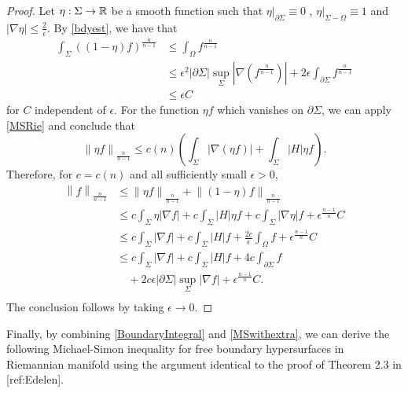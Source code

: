 \begin{proof}
    Let $\eta : \Sigma \to \mathbb{R}$ be a smooth function such that $\eta |_{\partial \Sigma } \equiv 0$ , $\eta |_{ \Sigma - \Omega } \equiv 1$ and $\left| \nabla \eta  \right| \leq \frac{2}{\epsilon }$. By \autoref{bdyest}, we have that 
    \begin{equation*}
    \begin{split}
        \int_{\Sigma} \left( \left( 1-\eta  \right) f \right) ^{\frac{n}{n-1}}
    &\leq \int_{\Omega }^{} f_{}^{\frac{n}{n-1}}   \\
    &\leq \epsilon ^2 \left| \partial \Sigma  \right| \sup _{\Sigma }\left| \nabla \left( f_{}^{\frac{n}{n-1}} \right)  \right| +2 \epsilon \int_{\partial \Sigma} f_{}^{\frac{n}{n-1}} \\
    &\leq \epsilon C
    \end{split}
    \end{equation*}
    for $C$ independent of $\epsilon $. For the function $\eta f$ which vanishes on $\partial \Sigma $, we can apply \autoref{MSRie} and conclude that 
    \[\left\| \eta  f \right\| _{\frac{n}{n-1}} \leq  c(n) \left( \int_{\Sigma} \left| \nabla (\eta f) \right| + \int_{\Sigma} \left| H  \right|\eta f  \right). \] 
    Therefore, for $c=c(n)$ and all sufficiently small $\epsilon >0$,
    \begin{equation*}
    \begin{split}
        \left\| f \right\| _{\frac{n}{n-1}} 
    &\leq \left\| \eta  f \right\| _{\frac{n}{n-1}}+\left\| (1-\eta )f \right\| _{\frac{n}{n-1}}  \\
    & \leq c \int_{\Sigma} \eta \left| \nabla f \right| +c \int_{\Sigma} \left| H \right| \eta f + c \int_{\Sigma} \left| \nabla \eta  \right| f + \epsilon ^{\frac{n-1}{n}}C\\
    &\leq c \int_{\Sigma}  \left| \nabla f \right| +c \int_{\Sigma} \left| H \right| f + \frac{2c}{\epsilon } \int_{\Omega }  f + \epsilon ^{\frac{n-1}{n}}C\\
    &\leq c \int_{\Sigma}  \left| \nabla f \right| +c \int_{\Sigma} \left| H \right| f +4c \int_{\partial \Sigma} f\\
    &\quad + 2c \epsilon  \left| \partial \Sigma  \right| \sup _{\Sigma }\left| \nabla f \right|+ \epsilon ^{\frac{n-1}{n}}C.\\
    \end{split}
    \end{equation*}
    The conclusion follows by taking $\epsilon \to 0$.
\end{proof}

Finally, by combining \autoref{BoundaryIntegral} and \autoref{MSwithextra}, we can derive the following Michael-Simon inequality for free boundary hypersurfaces in Riemannian manifold using the argument identical to the proof of Theorem 2.3 in [ref:Edelen].

